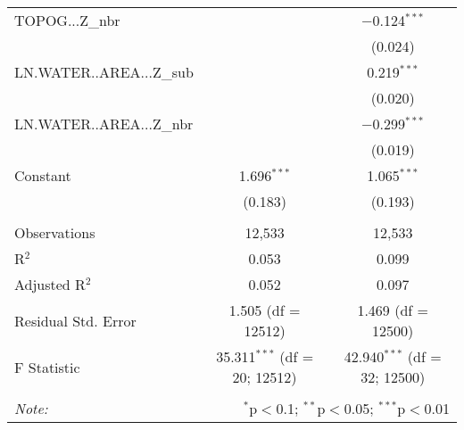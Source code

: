 \begin{table}[!htbp]
\begin{tabular}{@{\extracolsep{5pt}}lcc}
  TOPOG...Z\_nbr &  & $-$0.124$^{***}$ \\ 
  &  & (0.024) \\ 
  LN.WATER..AREA...Z\_sub &  & 0.219$^{***}$ \\ 
  &  & (0.020) \\ 
  LN.WATER..AREA...Z\_nbr &  & $-$0.299$^{***}$ \\ 
  &  & (0.019) \\ 
  Constant & 1.696$^{***}$ & 1.065$^{***}$ \\ 
  & (0.183) & (0.193) \\ 
 \hline \\[-1.8ex] 
Observations & 12,533 & 12,533 \\ 
R$^{2}$ & 0.053 & 0.099 \\ 
Adjusted R$^{2}$ & 0.052 & 0.097 \\ 
Residual Std. Error & 1.505 (df = 12512) & 1.469 (df = 12500) \\ 
F Statistic & 35.311$^{***}$ (df = 20; 12512) & 42.940$^{***}$ (df = 32; 12500) \\ 
\hline 
\hline \\[-1.8ex] 
\textit{Note:}  & \multicolumn{2}{r}{$^{*}$p$<$0.1; $^{**}$p$<$0.05; $^{***}$p$<$0.01} \\ 
\end{tabular} 
\end{table} 
